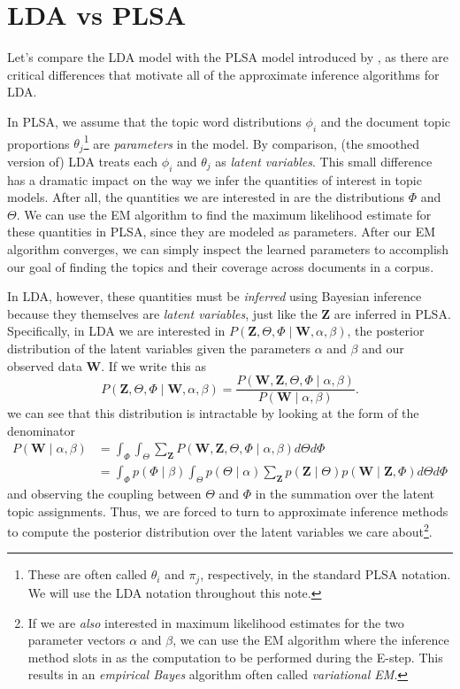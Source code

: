\documentclass[11pt]{article}
\begin{document}
\section{LDA vs PLSA}
Let's compare the LDA model with the PLSA model introduced by
\citet{Hofmann:1999:UAI}, as there are critical differences that motivate
all of the approximate inference algorithms for LDA.

In PLSA, we assume that the topic word distributions
$\phi_i$ and the document topic proportions $\theta_j$\footnote{These are
often called $\theta_i$ and $\pi_j$, respectively, in the standard PLSA
notation. We will use the LDA notation throughout this note.} are
\emph{parameters} in the model. By comparison, (the smoothed version of)
LDA treats each $\phi_i$ and $\theta_j$ as \emph{latent variables}. This
small difference has a dramatic impact on the way we infer the quantities
of interest in topic models. After all, the quantities we are interested in
are the distributions $\Phi$ and $\Theta$. We can use the EM algorithm to
find the maximum likelihood estimate for these quantities in PLSA, since
they are modeled as parameters. After our EM algorithm converges, we can
simply inspect the learned parameters to accomplish our goal of finding the
topics and their coverage across documents in a corpus.

In LDA, however, these quantities must be \emph{inferred} using Bayesian
inference because they themselves are \emph{latent variables}, just like
the $\mathbf{Z}$ are inferred in PLSA. Specifically, in LDA we are
interested in $P(\mathbf{Z}, \Theta, \Phi \mid \mathbf{W}, \alpha, \beta)$,
the posterior distribution of the latent variables given the parameters
$\alpha$ and $\beta$ and our observed data $\mathbf{W}$. If we write this
as
\begin{equation}
  P(\mathbf{Z}, \Theta, \Phi \mid \textbf{W}, \alpha, \beta) = \frac{P(\mathbf{W}, \mathbf{Z},
  \Theta, \Phi \mid \alpha, \beta)}{P(\mathbf{W} \mid \alpha, \beta)}.
\end{equation}
we can see that this distribution is intractable by looking at the form of
the denominator
\begin{align*}
  P(\mathbf{W} \mid \alpha, \beta)
  &=
  \int_\Phi
  \int_\Theta
  \sum_\mathbf{Z}
  P(\mathbf{W}, \mathbf{Z}, \Theta, \Phi \mid \alpha, \beta)
  d\Theta
  d\Phi\\
  &=
  \int_\Phi
  p(\Phi \mid \beta)
  \int_\Theta
  p(\Theta \mid \alpha)
  \sum_{\mathbf{Z}}
  p(\mathbf{Z} \mid \Theta)
  p(\mathbf{W} \mid \mathbf{Z}, \Phi)
  d\Theta
  d\Phi
\end{align*}
and observing the coupling between $\Theta$ and $\Phi$ in the summation
over the latent topic assignments. Thus, we are forced to turn to
approximate inference methods to compute the posterior distribution over
the latent variables we care about\footnote{If we are \emph{also}
interested in maximum likelihood estimates for the two parameter vectors
$\alpha$ and $\beta$, we can use the EM algorithm where the inference
method slots in as the computation to be performed during the E-step.
This results in an \emph{empirical Bayes} algorithm
often called \emph{variational EM}.}.
\end{document}
